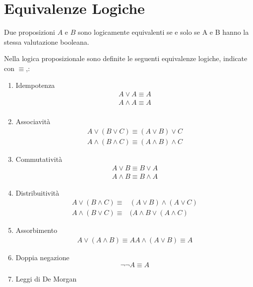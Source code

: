 \section{Equivalenze Logiche}
Due proposizioni $A$ e $B$ sono logicamente equivalenti se e solo se A e B hanno
la stessa valutazione booleana.

Nella logica proposizionale sono definite le seguenti equivalenze logiche, indicate con $\equiv$,:
\begin{enumerate}
    \item Idempotenza
            \begin{align*}
                A \lor A  \equiv  A \\
                A \land A  \equiv  A \\
            \end{align*}
    \item Associavità
            \begin{align*}
                A \lor (B \lor C) \equiv  (A \lor B) \lor C \\
                A \land (B \land C)  \equiv  (A \land B) \land C
            \end{align*}
    \item Commutatività
            \begin{align*}
                A \lor B  \equiv  B \lor A \\
                A \land B  \equiv  B \land A
            \end{align*}
    \item Distribuitività
            \begin{align*}
                A \lor (B \land C)  \equiv & (A \lor B) \land (A \lor C)\\
                A \land (B \lor C)  \equiv & (A \land B \lor (A \land C)
            \end{align*}
    \item Assorbimento
            \begin{align*}
                A \lor (A \land B)  \equiv  A
                A \land (A \lor B)  \equiv  A
            \end{align*}
    \item Doppia negazione
                \begin{equation*}
                    \neg \neg A \equiv A
                \end{equation*}
    \item Leggi di De Morgan
            \begin{align*}

\end{align*}
\end{enumerate}
